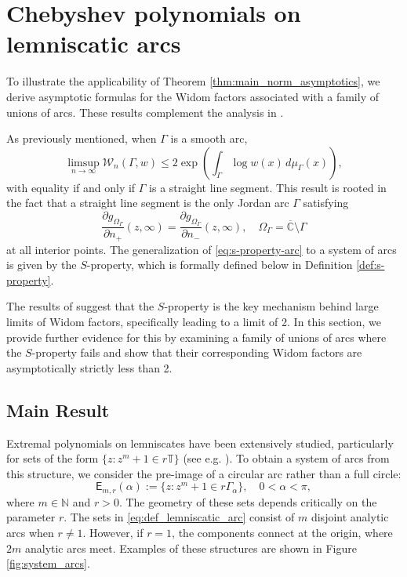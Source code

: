 \documentclass[12pt,oneside,reqno]{amsart}
\theoremstyle{definition}
\numberwithin{equation}{section}
\newcommand{\N}{{\mathbb N}}
\newcommand{\C}{{\mathbb C}}
\newcommand{\T}{{\mathbb T}}
\newcommand{\E}{{\mathsf E}}
\newcommand{\cW}{{\mathcal{W}}}
\newcommand{\RS}{\overline{\C}}
\begin{document}
\section{Chebyshev polynomials on lemniscatic arcs}
\label{sec:chebyshev_polynomials_system_of_arcs}
To illustrate the applicability of Theorem \ref{thm:main_norm_asymptotics}, we derive asymptotic formulas for the Widom factors associated with a family of unions of arcs. These results complement the analysis in \cite{christiansen-eichinger-rubin23}. 

As previously mentioned, when $\Gamma$ is a smooth arc,
\[
\limsup_{n \to \infty} \cW_n(\Gamma, w) \leq 2 \exp\left(\int_{\Gamma} \log w(x) \, d\mu_\Gamma(x)\right),
\] 
with equality if and only if $\Gamma$ is a straight line segment. This result is rooted in the fact that a straight line segment is the only Jordan arc \(\Gamma\) satisfying 
\begin{equation} 
\frac{\partial g_{\Omega_\Gamma}}{\partial n_+}(z,\infty) = \frac{\partial g_{\Omega_\Gamma}}{\partial n_-}(z,\infty), \quad \Omega_\Gamma = \RS\setminus \Gamma
\label{eq:s-property-arc}
\end{equation} 
at all interior points. The generalization of \eqref{eq:s-property-arc} to a system of arcs is given by the $S$-property, which is formally defined below in Definition \ref{def:s-property}.

The results of \cite{christiansen-eichinger-rubin23} suggest that the $S$-property is the key mechanism behind large limits of Widom factors, specifically leading to a limit of 2. In this section, we provide further evidence for this by examining a family of unions of arcs where the $S$-property fails and show that their corresponding Widom factors are asymptotically strictly less than 2.

\subsection{Main Result}
Extremal polynomials on lemniscates have been extensively studied, particularly for sets of the form $\{z:z^m+1\in r\T\}$ (see e.g. \cite{bergman-rubin24, peherstorfer-steinbauer01, minadiaz06, ullman60, he94}). To obtain a system of arcs from this structure, we consider the pre-image of a circular arc rather than a full circle:
\begin{equation}
	\E_{m,r}(\alpha):=\{z: z^m+1\in r \Gamma_\alpha\},\quad 0<\alpha<\pi,
	\label{eq:def_lemniscatic_arc}
\end{equation}
where $m\in \N$ and $r>0$. The geometry of these sets depends critically on the parameter $r$. The sets in \eqref{eq:def_lemniscatic_arc} consist of \(m\) disjoint analytic arcs when \(r \neq 1\). However, if \(r = 1\), the components connect at the origin, where \(2m\) analytic arcs meet. Examples of these structures are shown in Figure \ref{fig:system_arcs}.
\end{document}
